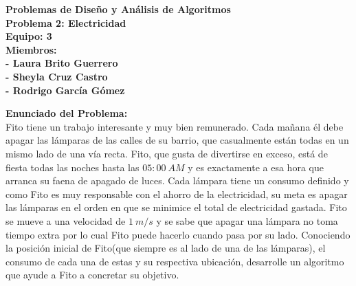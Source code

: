 \documentclass[10pt,letterpaper]{article}
\begin{document}
 	
	\Large{
 	\begin{center}
 		
 		 {\Huge \bf Problemas de Dise\~no y An\'alisis de Algoritmos}\\
 		 \vspace{1cm}
 		 {\Huge \bf Problema 2: Electricidad }\\ 
 		 \vspace{1cm}
 		 {\Large \bf Equipo: 3}\\
 		 \vspace{0.5cm}
 		 {\Large \bf Miembros:}\\
 		 {\bf - Laura Brito Guerrero}\\
 		 {\bf - Sheyla Cruz Castro}\\	
 		 {\bf - Rodrigo Garc\'ia G\'omez}\\
 		 
 	\end{center}
 	
 	{\Large \bf Enunciado del Problema:}\\
 	
 	Fito tiene un trabajo interesante y muy bien remunerado. Cada ma\~nana \'el debe apagar las l\'amparas de las calles de su barrio, que casualmente est\'an todas en un mismo lado de una v\'ia recta. Fito, que gusta de divertirse en exceso, est\'a de fiesta todas las noches hasta las $05:00 \ AM$ y es exactamente a esa hora que arranca su faena de apagado de luces. Cada l\'ampara tiene un consumo definido y como Fito es muy responsable con	el ahorro de la electricidad, su meta es apagar las l\'amparas en el orden en que se minimice el total de electricidad gastada. Fito se mueve a una velocidad de $1 \ m/s$ y se sabe que apagar una l\'ampara no toma tiempo extra por lo cual Fito puede hacerlo cuando pasa por su lado. Conociendo la posici\'on inicial de Fito(que siempre es al lado de una de las l\'amparas), el consumo de cada una de estas y su respectiva ubicaci\'on, desarrolle un algoritmo que ayude a Fito a concretar su objetivo.\\ 
 	
 	\begin{abstract}
 		Para este problema se logr\'o obtener un algoritmo $fuerza$ $bruta$ el cual es exponencial ya que revisa todos los subconjuntos posibles de caminos. Se siguieron estrategias $greedys$ en tiempo polinomial pero eran incorrectas, por esta raz\'on se cree que el problema es NP-completo e igualmente no llegamos a ninguna demostraci\'on, tratamos de reducirlo en los problemas del $Viajante$, el $3$-$SAT$ y el $Camino$ $de$ $Hamilton$ sin obtener resultados satisfactorios. \\ \\ \\
 	\end{abstract} 
 	
}
\end{document}
